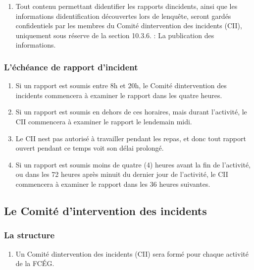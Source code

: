 \begin{enumerate}
 \item
  Tout contenu permettant d\textquotesingle identifier les rapports d\textquotesingle incidents, ainsi que les informations d\textquotesingle identification découvertes lors de l\textquotesingle enquête, seront gardés confidentiels par les membres du Comité d\textquotesingle intervention des incidents (CII), uniquement sous réserve de la section 10.3.6. : La publication des informations.
\end{enumerate}

\subsubsection{L'échéance de rapport d'incident}
\label{l-echeance-de-rapport-d-incident}

\begin{enumerate}
 \item
  Si un rapport est soumis entre 8h et 20h, le Comité d\textquotesingle intervention des incidents commencera à examiner le rapport dans les quatre heures.
 \item
  Si un rapport est soumis en dehors de ces horaires, mais durant l'activité, le CII commencera à examiner le rapport le lendemain midi.
 \item
  Le CII n\textquotesingle est pas autorisé à travailler pendant les repas, et donc tout rapport ouvert pendant ce temps voit son délai prolongé.
 \item
  Si un rapport est soumis moins de quatre (4) heures avant la fin de l'activité, ou dans les 72 heures après minuit du dernier jour de l'activité, le CII commencera à examiner le rapport dans les 36 heures suivantes.
\end{enumerate}

\subsection{Le Comité d'intervention des incidents}
\label{le-comite-d-intervention-des-incidents-2}

\subsubsection{La structure}
\label{la-structure-1}

\begin{enumerate}
 \item
  Un Comité d\textquotesingle intervention des incidents (CII) sera formé pour chaque activité de la FCÉG.
\end{enumerate}

